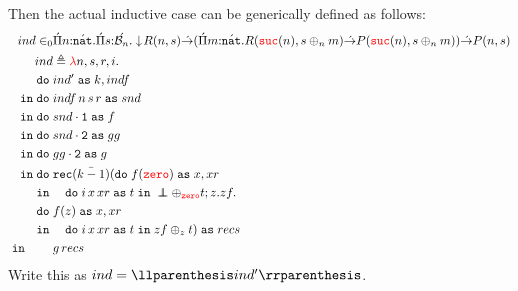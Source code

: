 Then the actual inductive case can be generically defined as follows:
\begin{align*}
  \isVal{ind}{&\pityc{\isOf{n}{\lift{\nat}}}{\pityc{\isOf{s}{\lift{\nseq{n}}}}
      {
      \squash{R(n,s)} \tolr (\pityc{\isOf{m}{\lift{\nat}}}{R(\suc{n}, s \oplus_n m) 
        \tolr P(\suc{n}, s \oplus_n m)}) \tolr P(n,s)}}}\\
        ind &\triangleq \lam{n,s,r,i}{}{\\
          \bind{&ind'}{k,indf\\}{
          \bind{&indf\,n\,s\,r}{snd\\}{
            \bind{&\fst{snd}}{f\\}{
              \bind{&\snd{snd}}{gg\\}{
                \bind{&\snd{gg}}{g\\}{
                  \bind{
                  &\rec{\bar{k-1}}{
                  \bind{f(\zero)}{x,xr\\}{
                    &\quad\bind{i\,x\,xr}{t}{
                    \empseq \oplus_{\zero} t
                    }
                  }
                }{z}{zf}{\\
                \bind{&f(z)}{x,xr\\}{
                    &\quad\bind{i\,x\,xr}{t}{
                    zf \oplus_{z} t
                  }
                  }
                }
              }{recs\\}{
                    \qquad &g\,recs
              }
              }
            }
          }
        }
        }
      }
\end{align*}
Write this as $ind = \wrap{ind'}$.


